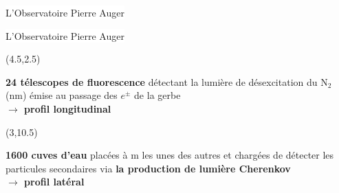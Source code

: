 \documentclass[t, compress]{beamer}
\begin{document}
{\begin{frame}[c, fragile]{\colorbox{white}{L'Observatoire Pierre Auger}}
\end{frame}

\begin{frame}[c, fragile]{\colorbox{white}{L'Observatoire Pierre Auger}}

  \begin{textblock}{5}(4.5,2.5)
    \begin{beamerboxesrounded}[upper=lrtuc,lower=lrtuc,shadow=false]
      {}\vspace{-0.1cm}
      \begin{center}
        \scriptsize \textbf{24 télescopes de fluorescence}
        détectant la lumière de désexcitation du N$_2$
        (\unit[300-400]{nm}) émise au passage des $e^\pm$ de la
        gerbe \\ \textbf{$\rightarrow$ profil longitudinal}
      \end{center}
    \end{beamerboxesrounded}
  \end{textblock}
  \begin{textblock}{6}(3,10.5)
    \begin{beamerboxesrounded}[upper=lrtuc,lower=lrtuc,shadow=false]
      {}\vspace{-0.1cm}
      \begin{center}
        \scriptsize \textbf{1600 cuves d'eau} placées à
        \unit[1500]{m} les unes des autres et chargées de détecter les
        particules secondaires via \textbf{la production de lumière
          Cherenkov} \\ \textbf{$\rightarrow$ profil latéral}
      \end{center}
    \end{beamerboxesrounded}
  \end{textblock}

\end{frame}
}
\end{document}
